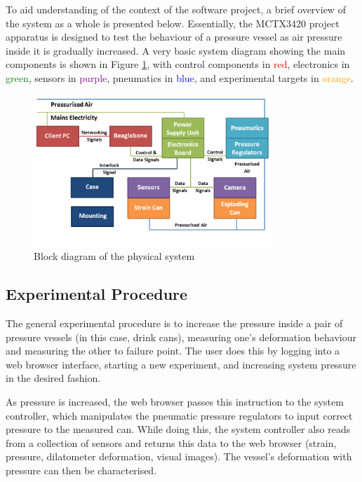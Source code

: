 To aid understanding of the context of the software project, a brief overview of the system as a whole is presented below. Essentially, the MCTX3420 project apparatus is designed to test the behaviour of a pressure vessel as air pressure inside it is gradually increased. A very basic system diagram showing the main components is shown in Figure \ref{system_overview.png}, with control components in \textcolor{red}{ red}, electronics in \textcolor{green}{ green}, sensors in \textcolor{Purple}{ purple}, pneumatics in \textcolor{blue}{ blue}, and experimental targets in \textcolor{Orange}{ orange}.

\begin{figure}[H]
	\centering
	\includegraphics[width=0.8\textwidth]{figures/system_overview.png}
	\caption{Block diagram of the physical system} 
	\label{system_overview.png}
\end{figure}

\subsection{Experimental Procedure}

The general experimental procedure is to increase the pressure inside a pair of pressure vessels (in this case, drink cans), measuring one's deformation behaviour and measuring the other to failure point. The user does this by logging into a web browser interface, starting a new experiment, and increasing system pressure in the desired fashion.

As pressure is increased, the web browser passes this instruction to the system controller, which manipulates the pneumatic pressure regulators to input correct pressure to the measured can. While doing this, the system controller also reads from a collection of sensors and returns this data to the web browser (strain, pressure, dilatometer deformation, visual images). The vessel's deformation with pressure can then be characterised.

